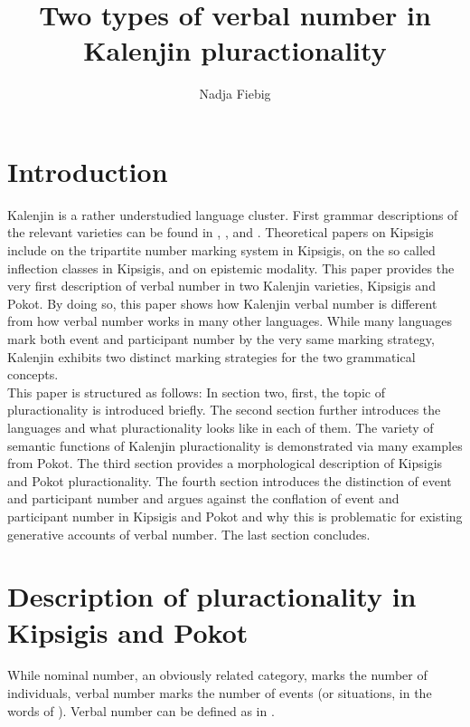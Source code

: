 \documentclass[output=paper,colorlinks,citecolor=brown
]{langscibook}
\author{Nadja Fiebig{}\affiliation{Leipzig University}}
\title{Two types of verbal number in Kalenjin pluractionality}
\begin{document}
\maketitle

\section{Introduction}\label{sec:feibig:sec1}

Kalenjin is a rather understudied language cluster. First grammar descriptions of the relevant varieties can be found in \citet{Toweet79}, \citet{Rottland82}, \citet{Crazzolara} and \citet{Beroja}. Theoretical papers on Kipsigis include \citet{Kouneli2020} on the tripartite number marking system in Kipsigis, \citet{Kouneli2022} on the so called inflection classes in Kipsigis, and \citet{Bossi23} on epistemic modality. This paper provides the very first description of verbal number in two Kalenjin varieties, Kipsigis and Pokot. By doing so, this paper shows how Kalenjin verbal number is different from how verbal number works in many other languages. While many languages mark both event and participant number by the very same marking strategy, Kalenjin exhibits two distinct marking strategies for the two grammatical concepts.\\ This paper is structured as follows: In section two, first, the topic of pluractionality is introduced briefly. The second section further introduces the languages and what pluractionality looks like in each of them. The variety of semantic functions of Kalenjin pluractionality is demonstrated via many examples from Pokot.  
The third section provides a morphological description of Kipsigis and Pokot pluractionality. The fourth section introduces the distinction of event and participant number and argues against the conflation of event and participant number in Kipsigis and Pokot and why this is problematic for existing generative accounts of verbal number. The last section concludes. 

\section{Description of pluractionality in Kipsigis and Pokot}\label{sec:feibig:sec2}

While nominal number, an obviously related category, marks the number of individuals, verbal number marks the number of events (or situations, in the words of \citealt{Mattiola2019}). Verbal number can be defined as in . 
\end{document}
